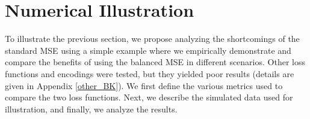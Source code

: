 \documentclass{article}
\theoremstyle{definition}
\begin{document}



\section{Numerical Illustration}
\label{Illu}

To illustrate the previous section, we propose analyzing the shortcomings of the standard MSE using a simple example where we empirically demonstrate and compare the benefits of using the balanced MSE in different scenarios. Other loss functions and encodings were tested, but they yielded poor results (details are given in  Appendix \ref{other_BK}). We first define the various metrics used to compare the two loss functions. Next, we describe the simulated data used for illustration, and finally, we analyze the results.
\end{document}

